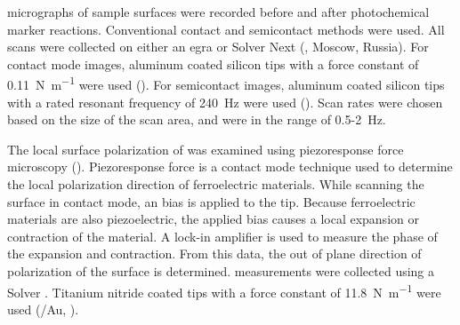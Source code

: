  micrographs of sample surfaces were recorded before and after photochemical marker reactions. Conventional contact and semicontact methods were used.\cite{Anonymous:YBI-TQ6H} All scans were collected on either an egra or Solver Next  (, Moscow, Russia). For contact mode images, aluminum coated silicon tips with a force constant of 0.11~\si{\newton\per\meter} were used (). For semicontact images, aluminum coated silicon tips with a rated resonant frequency of 240~\si{\hertz} were used (). Scan rates were chosen based on the size of the scan area, and were in the range of 0.5-2~\si{\hertz}.  

The local surface polarization of  was examined using piezoresponse force microscopy (). Piezoresponse force is a contact mode technique used to determine the local polarization direction of ferroelectric materials.\cite{Kalinin:2002hq,Kalinin:2006bg,Jungk:2006he,Rodriguez:2004bu} While scanning the surface in contact mode, an  bias is applied to the tip. Because ferroelectric materials are also piezoelectric, the applied bias causes a local expansion or contraction of the material. A lock-in amplifier is used to measure the phase of the expansion and contraction. From this data, the out of plane direction of polarization of the surface is determined.  measurements were collected using a Solver . Titanium nitride coated tips with a force constant of 11.8~\si{\newton\per\meter} were used (/Au, ).
